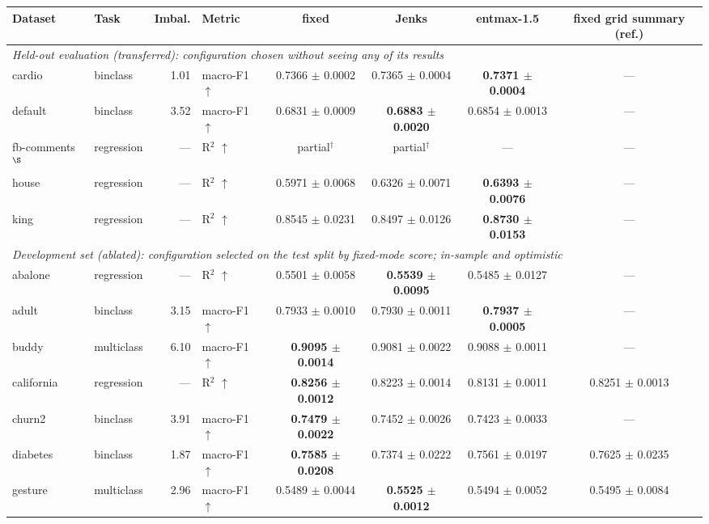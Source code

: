 \begin{table}[t]
\centering\small
\begin{tabular}{llrlcccc}
\toprule
Dataset & Task & Imbal. & Metric & fixed & Jenks & entmax-1.5 & fixed grid summary (ref.) \\
\midrule
\multicolumn{8}{l}{\textit{Held-out evaluation (transferred): configuration chosen without seeing any of its results}} \\
cardio & binclass & 1.01 & macro-F1 $\uparrow$ & 0.7366 $\pm$ 0.0002 & 0.7365 $\pm$ 0.0004 & \textbf{0.7371 $\pm$ 0.0004} & --- \\
default & binclass & 3.52 & macro-F1 $\uparrow$ & 0.6831 $\pm$ 0.0009 & \textbf{0.6883 $\pm$ 0.0020} & 0.6854 $\pm$ 0.0013 & --- \\
fb-comments$^\S$ & regression & — & R$^2$ $\uparrow$ & partial$^\dagger$ & partial$^\dagger$ & --- & --- \\
house & regression & — & R$^2$ $\uparrow$ & 0.5971 $\pm$ 0.0068 & 0.6326 $\pm$ 0.0071 & \textbf{0.6393 $\pm$ 0.0076} & --- \\
king & regression & — & R$^2$ $\uparrow$ & 0.8545 $\pm$ 0.0231 & 0.8497 $\pm$ 0.0126 & \textbf{0.8730 $\pm$ 0.0153} & --- \\
\midrule
\multicolumn{8}{l}{\textit{Development set (ablated): configuration selected on the test split by fixed-mode score; in-sample and optimistic}} \\
abalone & regression & — & R$^2$ $\uparrow$ & 0.5501 $\pm$ 0.0058 & \textbf{0.5539 $\pm$ 0.0095} & 0.5485 $\pm$ 0.0127 & --- \\
adult & binclass & 3.15 & macro-F1 $\uparrow$ & 0.7933 $\pm$ 0.0010 & 0.7930 $\pm$ 0.0011 & \textbf{0.7937 $\pm$ 0.0005} & --- \\
buddy & multiclass & 6.10 & macro-F1 $\uparrow$ & \textbf{0.9095 $\pm$ 0.0014} & 0.9081 $\pm$ 0.0022 & 0.9088 $\pm$ 0.0011 & --- \\
california & regression & — & R$^2$ $\uparrow$ & \textbf{0.8256 $\pm$ 0.0012} & 0.8223 $\pm$ 0.0014 & 0.8131 $\pm$ 0.0011 & 0.8251 $\pm$ 0.0013 \\
churn2 & binclass & 3.91 & macro-F1 $\uparrow$ & \textbf{0.7479 $\pm$ 0.0022} & 0.7452 $\pm$ 0.0026 & 0.7423 $\pm$ 0.0033 & --- \\
diabetes & binclass & 1.87 & macro-F1 $\uparrow$ & \textbf{0.7585 $\pm$ 0.0208} & 0.7374 $\pm$ 0.0222 & 0.7561 $\pm$ 0.0197 & 0.7625 $\pm$ 0.0235 \\
gesture & multiclass & 2.96 & macro-F1 $\uparrow$ & 0.5489 $\pm$ 0.0044 & \textbf{0.5525 $\pm$ 0.0012} & 0.5494 $\pm$ 0.0052 & 0.5495 $\pm$ 0.0084 \\

\end{tabular}
\end{table}
